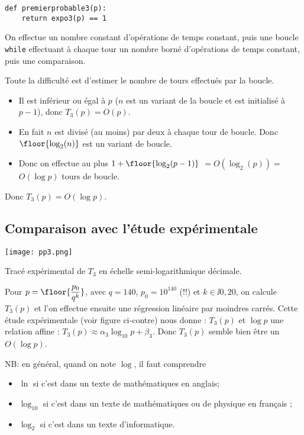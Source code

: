 \begin{lstlisting}
def premierprobable3(p):
    return expo3(p) == 1
\end{lstlisting}


On effectue un nombre constant d'opérations de temps constant, puis
une boucle \texttt{while} effectuant à chaque tour un nombre borné
d'opérations de temps constant, puis une comparaison.

Toute la difficulté est d'estimer le nombre de tours effectués par la
boucle.
\begin{itemize}
\item Il est inférieur ou égal à $p$ ($n$ est un variant de la
  boucle et est initialisé à $p-1$), donc $T_{3}(p)=O(p)$.
\item En fait $n$
  est divisé (au moins) par deux à chaque tour de boucle. Donc
  $\floor{\log_{2}(n)}$ est un variant de boucle.
\item Donc on effectue au
  plus $1+ \floor{\log_{2}(p-1)}$ $= O(\log_{2}(p)) =$ $ O(\log p)$ tours de boucle.
\end{itemize}
Donc $T_{3}(p) = O(\log p)$.


\subsection{Comparaison avec l'étude expérimentale}


  \begin{marginfigure}
    \texttt{[image: pp3.png]}
    \caption{Tracé expérimental de $T_3$ en échelle semi-logarithmique décimale.}
   \label{fig.pp3}
  \end{marginfigure}
Pour $p = \floor{\dfrac{p_0}{q^k}}$, avec $q = 140$, $p_0 = 10^{140}$ (!!) et $k\in\ii{0,20}$, on calcule $T_3(p)$ et l'on effectue ensuite une régression linéaire par moindres carrés. Cette étude expérimentale 
(voir figure ci-contre) 
nous donne :
$T_{3}(p)$ et $\log p$ une relation affine :
$  T_{3}(p) \approx \alpha_{3}\log_{10} p + \beta_{3}$. Donc $T_{3}(p)$ semble bien être un $O(\log p)$.

NB: en général, quand on note $\log$, il faut comprendre
\begin{itemize}
\item $\ln$ si c'est dans un texte de mathématiques en anglais;
\item $\log_{10}$ si c'est dans un texte de mathématiques ou de
  physique en français ;
\item $\log_{2}$ si c'est dans un texte d'informatique.
\end{itemize}



